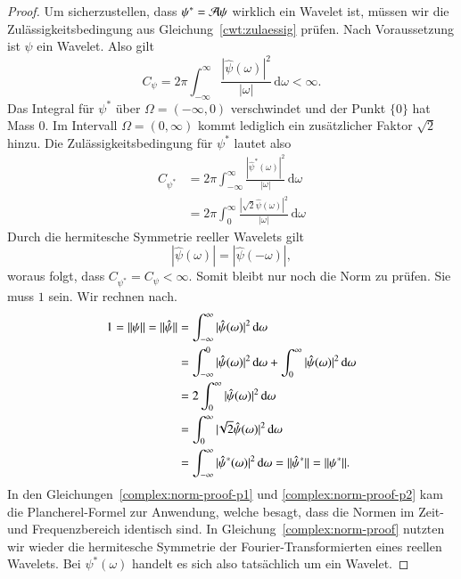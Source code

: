 \begin{proof}
	Um sicherzustellen, dass $\psi^\ast = \Ana\psi$ wirklich ein Wavelet ist, müssen wir die Zulässigkeitsbedingung aus Gleichung~\eqref{cwt:zulaessig} prüfen.
	Nach Voraussetzung ist $\psi$ ein Wavelet.
	Also gilt
	\[
	C_{\psi}
	=
	2\pi
	\int_{-\infty}^\infty \frac{|\hat{\psi}(\omega)|^2}{|\omega|}\,\mathrm{d}\omega < \infty.
	\]
	Das Integral für $\psi^\ast$ über $\Omega = (-\infty, 0)$ verschwindet und der Punkt $\lbrace 0 \rbrace$ hat Mass $0$.
	Im Intervall $\Omega = (0, \infty)$ kommt lediglich ein zusätzlicher Faktor $\sqrt 2$ hinzu.
	Die Zulässigkeitsbedingung für $\psi^\ast$ lautet also
	\begin{align*}
		C_{\psi^\ast}
		&= 2\pi	\int_{-\infty}^\infty \frac{|\hat{\psi}^\ast(\omega)|^2}{|\omega|}\,\mathrm{d}\omega \\
		&= 2\pi \int_{0}^\infty \frac{|\!\sqrt{2}\hat{\psi}(\omega)|^2}{|\omega|}\,\mathrm{d}\omega
	\end{align*}
	Durch die hermitesche Symmetrie reeller Wavelets gilt 
	\[|\hat\psi(\omega)| = |\hat\psi(-\omega)|,\]
	woraus folgt, dass $C_{\psi^\ast} = C_{\psi} < \infty.$
	Somit bleibt nur noch die Norm zu prüfen.
	Sie muss $1$ sein.
	Wir rechnen nach.
	\begin{align}
	1 = \|\psi\| = \|\hat{\psi}\| 
	&= \int_{-\infty}^{\infty}|\hat{\psi}(\omega)|^2 \,\mathrm{d}\omega \label{complex:norm-proof-p1}\\
	&= \int_{-\infty}^{0}|\hat{\psi}(\omega)|^2 \,\mathrm{d}\omega +  \int_{0}^{\infty}|\hat{\psi}(\omega)|^2 \,\mathrm{d}\omega \notag\\
	&=  2\int_{0}^{\infty} |\hat{\psi}(\omega)|^2 \,\mathrm{d}\omega \label{complex:norm-proof}\\
	&=  \int_{0}^{\infty}|\!\sqrt{2}\hat{\psi}(\omega)|^2 \,\mathrm{d}\omega \notag\\
	&=  \int_{-\infty}^{\infty}|\hat{\psi}^\ast(\omega)|^2 \,\mathrm{d}\omega 
	= \|\hat{\psi}^\ast\| = \|\psi^\ast\|.\label{complex:norm-proof-p2}
	\end{align}
	In den Gleichungen~\eqref{complex:norm-proof-p1} und \eqref{complex:norm-proof-p2} kam die Plancherel-Formel zur Anwendung, welche besagt, dass die Normen im Zeit- und Frequenzbereich identisch sind.
	In Gleichung~\eqref{complex:norm-proof} nutzten wir wieder die hermitesche Symmetrie der Fourier-Transformierten eines reellen Wavelets.
	Bei $\psi^\ast(\omega)$ handelt es sich also tatsächlich um ein Wavelet.
\end{proof}


